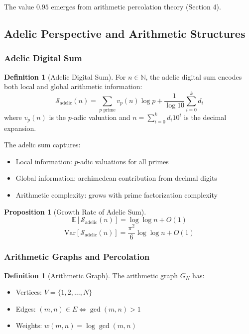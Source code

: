 \documentclass[11pt,a4paper]{article}
\theoremstyle{plain}
\newtheorem{proposition}[theorem]{Proposition}
\theoremstyle{definition}
\newtheorem{definition}[theorem]{Definition}
\theoremstyle{remark}
\newcommand{\adelicsum}{\mathcal{S}_{\text{adelic}}}
\newcommand{\N}{\mathbb{N}}
\begin{document}
The value $0.95$ emerges from arithmetic percolation theory (Section 4).

\subsection{Adelic Perspective and Arithmetic Structures}

\subsubsection{Adelic Digital Sum}

\begin{definition}[Adelic Digital Sum]
For $n \in \N$, the adelic digital sum encodes both local and global arithmetic information:
\begin{equation}
\adelicsum(n) = \sum_{p \text{ prime}} v_p(n) \log p + \frac{1}{\log 10} \sum_{i=0}^{k} d_i
\end{equation}
where $v_p(n)$ is the $p$-adic valuation and $n = \sum_{i=0}^{k} d_i 10^i$ is the decimal expansion.
\end{definition}

The adelic sum captures:
\begin{itemize}
\item Local information: $p$-adic valuations for all primes
\item Global information: archimedean contribution from decimal digits
\item Arithmetic complexity: grows with prime factorization complexity
\end{itemize}

\begin{proposition}[Growth Rate of Adelic Sum]
\begin{equation}
\mathbb{E}[\adelicsum(n)] = \log \log n + O(1)
\end{equation}
\begin{equation}
\text{Var}[\adelicsum(n)] = \frac{\pi^2}{6} \log \log n + O(1)
\end{equation}
\end{proposition}

\subsubsection{Arithmetic Graphs and Percolation}

\begin{definition}[Arithmetic Graph]
The arithmetic graph $G_N$ has:
\begin{itemize}
\item Vertices: $V = \{1, 2, \ldots, N\}$
\item Edges: $(m,n) \in E \iff \gcd(m,n) > 1$
\item Weights: $w(m,n) = \log \gcd(m,n)$
\end{itemize}
\end{definition}
\end{document}
